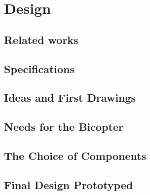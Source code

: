 \chapter{Design}
\label{sec:design}

\section{Related works}

\section{Specifications}
\section{Ideas and First Drawings}
\section{Needs for the Bicopter}
\section{The Choice of Components}
\section{Final Design Prototyped}

